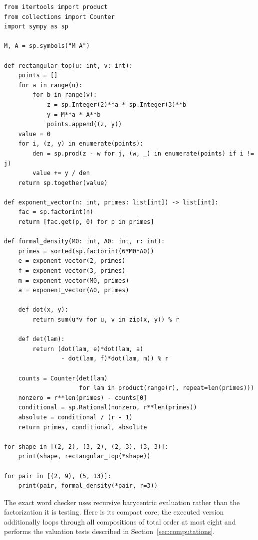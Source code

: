 \documentclass[11pt,oneside]{article}
\theoremstyle{definition}
\theoremstyle{remark}
\begin{document}
\begin{lstlisting}[style=pythonstyle]
from itertools import product
from collections import Counter
import sympy as sp

M, A = sp.symbols("M A")

def rectangular_top(u: int, v: int):
    points = []
    for a in range(u):
        for b in range(v):
            z = sp.Integer(2)**a * sp.Integer(3)**b
            y = M**a * A**b
            points.append((z, y))
    value = 0
    for i, (z, y) in enumerate(points):
        den = sp.prod(z - w for j, (w, _) in enumerate(points) if i != j)
        value += y / den
    return sp.together(value)

def exponent_vector(n: int, primes: list[int]) -> list[int]:
    fac = sp.factorint(n)
    return [fac.get(p, 0) for p in primes]

def formal_density(M0: int, A0: int, r: int):
    primes = sorted(sp.factorint(6*M0*A0))
    e = exponent_vector(2, primes)
    f = exponent_vector(3, primes)
    m = exponent_vector(M0, primes)
    a = exponent_vector(A0, primes)

    def dot(x, y):
        return sum(u*v for u, v in zip(x, y)) % r

    def det(lam):
        return (dot(lam, e)*dot(lam, a)
                - dot(lam, f)*dot(lam, m)) % r

    counts = Counter(det(lam)
                     for lam in product(range(r), repeat=len(primes)))
    nonzero = r**len(primes) - counts[0]
    conditional = sp.Rational(nonzero, r**len(primes))
    absolute = conditional / (r - 1)
    return primes, conditional, absolute

for shape in [(2, 2), (3, 2), (2, 3), (3, 3)]:
    print(shape, rectangular_top(*shape))

for pair in [(2, 9), (5, 13)]:
    print(pair, formal_density(*pair, r=3))
\end{lstlisting}

The exact word checker uses recursive barycentric evaluation rather than the factorization it
is testing.  Here is its compact core; the executed version additionally loops through all
compositions of total order at most eight and performs the valuation tests described in
Section~\ref{sec:computations}.
\end{document}
